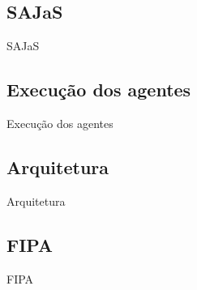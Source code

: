 
\subsection{SAJaS}
\begin{frame}{SAJaS}

\end{frame}

\subsection{Execução dos agentes}
\begin{frame}{Execução dos agentes}

\end{frame}

\subsection{Arquitetura}
\begin{frame}{Arquitetura}

\end{frame}

\subsection{FIPA}
\begin{frame}{FIPA}

\end{frame}